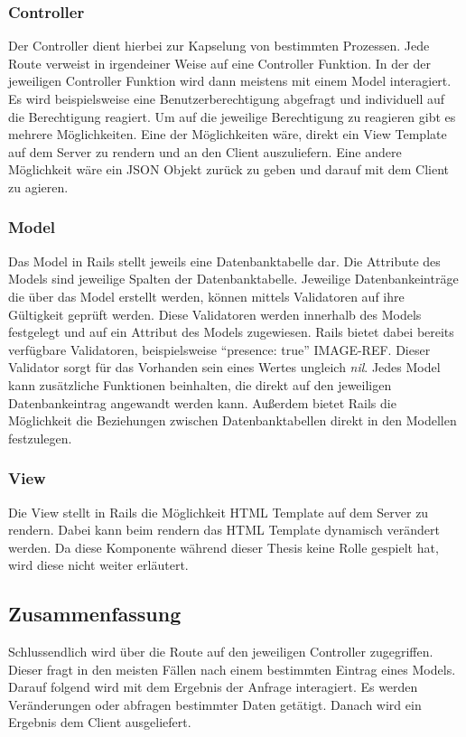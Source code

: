 \documentclass[11pt]{article}
\newcommand{\hlnote}[2]{#1}
\newcommand{\hlnote}[2]{\todo{#2}\texthl{#1}}
\begin{document}
	\subsubsection{Controller}
	\label{sec: rails_controller}
	Der Controller dient hierbei zur Kapselung von bestimmten Prozessen. Jede Route verweist in irgendeiner Weise auf eine Controller Funktion. In der der jeweiligen Controller Funktion wird dann meistens mit einem Model interagiert. Es wird beispielsweise eine Benutzerberechtigung abgefragt und individuell auf die Berechtigung reagiert. Um auf die jeweilige Berechtigung zu reagieren gibt es mehrere Möglichkeiten. Eine der Möglichkeiten wäre, direkt ein View Template auf dem Server zu rendern und an den Client auszuliefern. Eine andere Möglichkeit wäre ein \gls{JSON} Objekt zurück zu geben und darauf mit dem Client zu agieren.
	
	\subsubsection{Model}
	\label{sec: rails_model}
	Das Model in Rails stellt jeweils eine Datenbanktabelle dar. Die Attribute des Models sind jeweilige Spalten der Datenbanktabelle. Jeweilige Datenbankeinträge die über das Model erstellt werden, können mittels Validatoren auf ihre Gültigkeit geprüft werden. Diese Validatoren werden innerhalb des Models festgelegt und auf ein Attribut des Models zugewiesen. Rails bietet dabei bereits verfügbare Validatoren, beispielsweise \enquote{presence: true} \hlnote{IMAGE-REF}{Bild Referenz}. Dieser Validator sorgt für das Vorhanden sein eines Wertes ungleich \textit{nil}. Jedes Model kann zusätzliche Funktionen beinhalten, die direkt auf den jeweiligen Datenbankeintrag angewandt werden kann. Außerdem bietet Rails die Möglichkeit die Beziehungen zwischen Datenbanktabellen direkt in den Modellen festzulegen.
	
	\subsubsection{View}
	\label{sec: rails_view}
	Die View stellt in Rails die Möglichkeit \gls{HTML} Template auf dem Server zu rendern. Dabei kann beim rendern das \gls{HTML} Template dynamisch verändert werden. Da diese Komponente während dieser Thesis keine Rolle gespielt hat, wird diese nicht weiter erläutert.
	
	\subsection{Zusammenfassung}
	\label{sec: rails_resuemee}
	Schlussendlich wird über die Route auf den jeweiligen Controller zugegriffen. Dieser fragt in den meisten Fällen nach einem bestimmten Eintrag eines Models. Darauf folgend wird mit dem Ergebnis der Anfrage interagiert. Es werden Veränderungen oder abfragen bestimmter Daten getätigt. Danach wird ein Ergebnis dem Client ausgeliefert.
	
\end{document}
